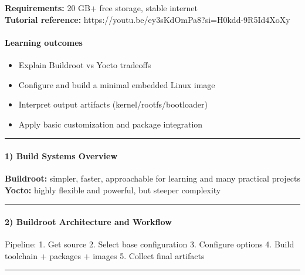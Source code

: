 \documentclass[
  english,
  paper=a4,
  oneside  ,captions=tableheading
]{scrartcl}
\providecommand{\tightlist}{%
  \setlength{\itemsep}{0pt}\setlength{\parskip}{0pt}}
\renewenvironment{quote}{\begin{customblockquote}\list{}{\rightmargin=0em\leftmargin=0em}%
\item\relax\color{blockquote-text}\ignorespaces}{\unskip\unskip\endlist\end{customblockquote}}
\begin{document}
\begin{quote}
\textbf{Requirements:} 20 GB+ free storage, stable internet\\
\textbf{Tutorial reference:}
https://youtu.be/ey3sKdOmPa8?si=H0kdd-9R5Id4XoXy
\end{quote}

\paragraph{Learning outcomes}\label{learning-outcomes-10}

\begin{itemize}
\tightlist
\item
  Explain Buildroot vs Yocto tradeoffs
\item
  Configure and build a minimal embedded Linux image
\item
  Interpret output artifacts (kernel/rootfs/bootloader)
\item
  Apply basic customization and package integration
\end{itemize}

\begin{center}\rule{0.5\linewidth}{0.5pt}\end{center}

\paragraph{1) Build Systems Overview}\label{build-systems-overview}

\textbf{Buildroot:} simpler, faster, approachable for learning and many
practical projects\\
\textbf{Yocto:} highly flexible and powerful, but steeper complexity

\begin{center}\rule{0.5\linewidth}{0.5pt}\end{center}

\paragraph{2) Buildroot Architecture and
Workflow}\label{buildroot-architecture-and-workflow}

Pipeline: 1. Get source 2. Select base configuration 3. Configure
options 4. Build toolchain + packages + images 5. Collect final
artifacts

\begin{center}\rule{0.5\linewidth}{0.5pt}\end{center}
\end{document}
